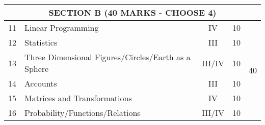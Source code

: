 \begin{center}
\begin{tabular}{cl|c|c|c|}
\multicolumn{5}{|c|}{\textbf{SECTION B (40 MARKS - CHOOSE 4)}} \\ \hline
\multicolumn{1}{|c|}{11} & Linear Programming & IV & 10 & \multirow{6}{*}{40} \\ \cline{1-4}
\multicolumn{1}{|c|}{12} & Statistics & III & 10 & \\ \cline{1-4}
\multicolumn{1}{|c|}{13} & Three Dimensional Figures\slash Circles\slash Earth as a Sphere & III\slash IV & 10 & \\ \cline{1-4}
\multicolumn{1}{|c|}{14} & Accounts & III & 10 & \\ \cline{1-4}
\multicolumn{1}{|c|}{15} & Matrices and Transformations & IV & 10 & \\ \cline{1-4}
\multicolumn{1}{|c|}{16} & Probability\slash Functions\slash Relations & III\slash IV & 10 & \\ \hline

\end{tabular}
\end{center}

%
%

